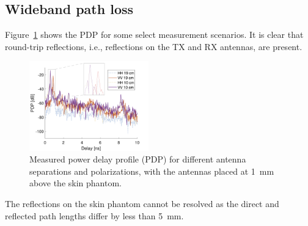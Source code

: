 \documentclass[preprint]{rsl}
\begin{document}
\subsection{Wideband path loss}

Figure~\ref{fig:PDP} shows the PDP for some select measurement scenarios. 
It is clear that round-trip reflections, i.e., reflections on the TX and RX antennas, are present.
\begin{figure}[tb]
\begin{center}
	\includegraphics[width=0.46\textwidth]{figures/PDP.png}
\caption{Measured power delay profile (PDP) for different antenna separations and polarizations, with the antennas placed at 1~mm above the skin phantom.}
\label{fig:PDP}
\end{center}
\end{figure}
The reflections on the skin phantom cannot be resolved as the direct and reflected path lengths differ by less than 5~mm.
\end{document}
